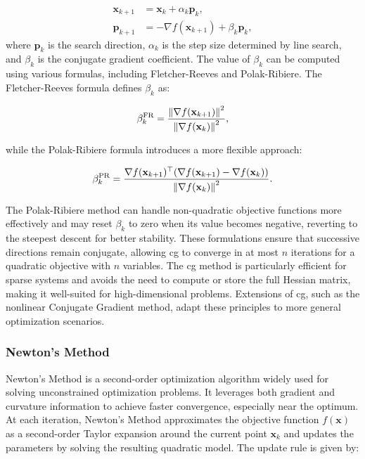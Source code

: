 \begin{align}
\mathbf{x}_{k+1} &= \mathbf{x}_k + \alpha_k \mathbf{p}_k, \\
\mathbf{p}_{k+1} &= -\nabla f(\mathbf{x}_{k+1}) + \beta_k \mathbf{p}_k,
\end{align}
where $\mathbf{p}_k$ is the search direction, $\alpha_k$ is the step size determined by line search, and $\beta_k$ is the conjugate gradient coefficient. The value of $\beta_k$ can be computed using various formulas, including Fletcher-Reeves and Polak-Ribiere. The Fletcher-Reeves formula defines $\beta_k$ as:

\begin{equation}
\beta_k^{\text{FR}} = \frac{\norm{\nabla f(\mathbf{x}_{k+1})}^2}{\norm{\nabla f(\mathbf{x}_k)}^2},
\end{equation}

\noindent while the Polak-Ribiere formula introduces a more flexible approach:

\begin{equation}
\beta_k^{\text{PR}} = \frac{\nabla f(\mathbf{x}_{k+1})^\top (\nabla f(\mathbf{x}_{k+1}) - \nabla f(\mathbf{x}_k))}{\norm{\nabla f(\mathbf{x}_k)}^2}.
\end{equation}

\noindent The Polak-Ribiere method can handle non-quadratic objective functions more effectively and may reset $\beta_k$ to zero when its value becomes negative, reverting to the steepest descent for better stability. These formulations ensure that successive directions remain conjugate, allowing \ac{cg} to converge in at most $n$ iterations for a quadratic objective with $n$ variables. The \ac{cg} method is particularly efficient for sparse systems and avoids the need to compute or store the full Hessian matrix, making it well-suited for high-dimensional problems. Extensions of \ac{cg}, such as the nonlinear Conjugate Gradient method, adapt these principles to more general optimization scenarios.

\subsubsection{Newton's Method}
\label{subsubsection:newtons_method}
Newton's Method is a second-order optimization algorithm widely used for solving unconstrained optimization problems. It leverages both gradient and curvature information to achieve faster convergence, especially near the optimum. At each iteration, Newton's Method approximates the objective function $f(\mathbf{x})$ as a second-order Taylor expansion around the current point $\mathbf{x}_k$ and updates the parameters by solving the resulting quadratic model. The update rule is given by:

